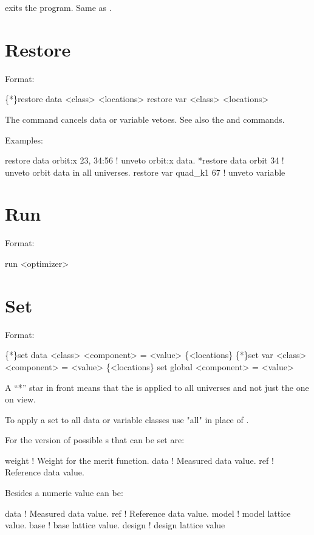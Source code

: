\vskip 0.2in
 exits the program. Same as .

\section{Restore}
\label{s:restore}

Format:
\begin{example}
  \{*\}restore data  <class> <locations>
  restore var <class> <locations>
\end{example}

\vskip 0.2in The  command cancels data or variable
vetoes. See also the 
and  commands.

Examples:
\begin{example}
  restore data orbit:x  23, 34:56 ! unveto orbit:x data.
  *restore data orbit 34          ! unveto orbit data in all universes.
  restore var quad_k1 67     ! unveto variable
\end{example}


\section{Run}
\label{s:run}

Format:
\begin{example}
  run <optimizer>
\end{example}

\vskip 0.2in

\section{Set}
\label{s:set}

Format:
\begin{example}
  \{*\}set data <class> <component> = <value> \{<locations\}
  \{*\}set var <class> <component> = <value> \{<locations\}
  set global <component> = <value>
\end{example}

\vskip 0.2in
A ``*'' star in front means that the  is applied
to all universes and not just the one on view.

To apply a set to all data or variable classes use "all"
in place of .

For the  version of  possible 
s that can be set are:
\begin{example}
  weight      ! Weight for the merit function.
  data        ! Measured data value.
  ref         ! Reference data value.
\end{example}
Besides a numeric value  can be:
\begin{example}
  data        ! Measured data value.
  ref         ! Reference data value.
  model       ! model lattice value.
  base        ! base lattice value.
  design      ! design lattice value
\end{example}

